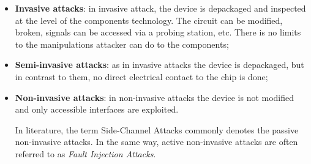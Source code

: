 \begin{itemize}
\item[] \textbf{Invasive attacks}: in invasive attack, the device is depackaged and inspected at the level of the components technology. The circuit can be modified, broken, signals can be accessed via a probing station, etc. There is no limits to the manipulations attacker can do to the components;
\item[] \textbf{Semi-invasive attacks}: as in invasive attacks the device is depackaged, but in contrast to them, no direct electrical contact to the chip is done;
\item[] \textbf{Non-invasive attacks}: in non-invasive attacks the device is not modified and only accessible interfaces are exploited. 

In literature, the term Side-Channel Attacks commonly denotes the passive non-invasive attacks. In the same way, active non-invasive attacks are often referred to as \emph{Fault Injection Attacks}. 

\end{itemize}

